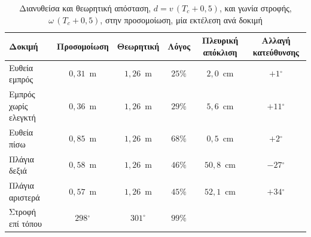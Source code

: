 \begin{table}[htbp]
    \centering
    \small
    \begin{tabular}{@{}l c c c c c@{}}
        \toprule
        Δοκιμή & Προσομοίωση & Θεωρητική & Λόγος & Πλευρική απόκλιση & Αλλαγή κατεύθυνσης \\
        \midrule
        Ευθεία εμπρός & $0{,}31$~m & $1{,}26$~m & $25\%$ & $2{,}0$~cm & $+1$$^\circ$ \\
        Εμπρός χωρίς ελεγκτή & $0{,}36$~m & $1{,}26$~m & $29\%$ & $5{,}6$~cm & $+11$$^\circ$ \\
        Ευθεία πίσω & $0{,}85$~m & $1{,}26$~m & $68\%$ & $0{,}5$~cm & $+2$$^\circ$ \\
        Πλάγια δεξιά & $0{,}58$~m & $1{,}26$~m & $46\%$ & $50{,}8$~cm & $-27$$^\circ$ \\
        Πλάγια αριστερά & $0{,}57$~m & $1{,}26$~m & $45\%$ & $52{,}1$~cm & $+34$$^\circ$ \\
        Στροφή επί τόπου & $298$$^\circ$ & $301^\circ$ & $99\%$ & & \\
        \bottomrule
    \end{tabular}
    \caption[Διανυθείσα απόσταση και γωνία στροφής στην προσομοίωση]{Διανυθείσα και θεωρητική απόσταση, $d = v\,(T_c + 0{,}5)$, και γωνία στροφής, $\omega\,(T_c + 0{,}5)$, στην προσομοίωση, μία εκτέλεση ανά δοκιμή}
    \label{tab:sim-distance}
\end{table}
